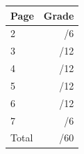 \documentclass[12pt]{article}
\newcommand{\skipline}{\vspace{12pt}}
\begin{document}
\begin{table}[hbt]
\begin{center}
\begin{tabular}{|l|r|} \hline
Page&Grade\\
\hline \hline
\cline{1-2} 2 & \enspace\enspace\enspace\enspace\enspace\enspace/6\\
\cline{1-2} 3 & \enspace\enspace\enspace\enspace\enspace\enspace/12\\
\cline{1-2} 4 & \enspace\enspace\enspace\enspace\enspace\enspace/12\\
\cline{1-2} 5 & \enspace\enspace\enspace\enspace\enspace\enspace/12\\
\cline{1-2} 6 & \enspace\enspace\enspace\enspace\enspace\enspace/12\\
\cline{1-2} 7 & \enspace\enspace\enspace\enspace\enspace\enspace/6\\
\cline{1-2} Total & \enspace\enspace\enspace\enspace\enspace\enspace/60\\
\hline
\end{tabular}

\skipline

\skipline

\skipline


\end{center}
\end{table}
\newpage
\end{document}
